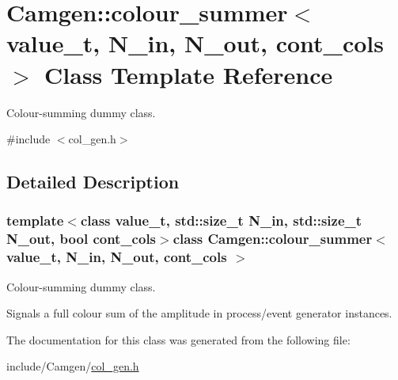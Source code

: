 \hypertarget{a00087}{}\section{Camgen\+:\+:colour\+\_\+summer$<$ value\+\_\+t, N\+\_\+in, N\+\_\+out, cont\+\_\+cols $>$ Class Template Reference}
\label{a00087}


Colour-\/summing dummy class.  




{\ttfamily \#include $<$col\+\_\+gen.\+h$>$}



\subsection{Detailed Description}
\subsubsection*{template$<$class value\+\_\+t, std\+::size\+\_\+t N\+\_\+in, std\+::size\+\_\+t N\+\_\+out, bool cont\+\_\+cols$>$class Camgen\+::colour\+\_\+summer$<$ value\+\_\+t, N\+\_\+in, N\+\_\+out, cont\+\_\+cols $>$}

Colour-\/summing dummy class. 

Signals a full colour sum of the amplitude in process/event generator instances. 

The documentation for this class was generated from the following file\+:\begin{DoxyCompactItemize}
\item 
include/\+Camgen/\hyperlink{a00612}{col\+\_\+gen.\+h}\end{DoxyCompactItemize}
